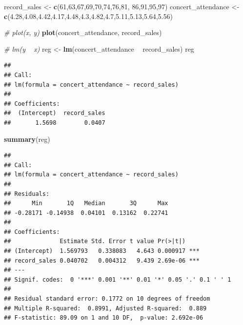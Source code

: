 \documentclass[]{book}
\newenvironment{Shaded}{\begin{snugshade}}{\end{snugshade}}
\newcommand{\CommentTok}[1]{\textcolor[rgb]{0.56,0.35,0.01}{\textit{#1}}}
\newcommand{\DecValTok}[1]{\textcolor[rgb]{0.00,0.00,0.81}{#1}}
\newcommand{\FloatTok}[1]{\textcolor[rgb]{0.00,0.00,0.81}{#1}}
\newcommand{\KeywordTok}[1]{\textcolor[rgb]{0.13,0.29,0.53}{\textbf{#1}}}
\newcommand{\NormalTok}[1]{#1}
\newcommand{\OperatorTok}[1]{\textcolor[rgb]{0.81,0.36,0.00}{\textbf{#1}}}
\newcommand{\StringTok}[1]{\textcolor[rgb]{0.31,0.60,0.02}{#1}}
\begin{document}
\begin{Shaded}
\begin{Highlighting}[]
\NormalTok{record_sales <-}\StringTok{ }\KeywordTok{c}\NormalTok{(}\DecValTok{61}\NormalTok{,}\DecValTok{63}\NormalTok{,}\DecValTok{67}\NormalTok{,}\DecValTok{69}\NormalTok{,}\DecValTok{70}\NormalTok{,}\DecValTok{74}\NormalTok{,}\DecValTok{76}\NormalTok{,}\DecValTok{81}\NormalTok{, }\DecValTok{86}\NormalTok{,}\DecValTok{91}\NormalTok{,}\DecValTok{95}\NormalTok{,}\DecValTok{97}\NormalTok{)}
\NormalTok{concert_attendance <-}\StringTok{ }\KeywordTok{c}\NormalTok{(}\FloatTok{4.28}\NormalTok{,}\FloatTok{4.08}\NormalTok{,}\FloatTok{4.42}\NormalTok{,}\FloatTok{4.17}\NormalTok{,}\FloatTok{4.48}\NormalTok{,}\FloatTok{4.3}\NormalTok{,}\FloatTok{4.82}\NormalTok{,}\FloatTok{4.7}\NormalTok{,}\FloatTok{5.11}\NormalTok{,}\FloatTok{5.13}\NormalTok{,}\FloatTok{5.64}\NormalTok{,}\FloatTok{5.56}\NormalTok{)}

\CommentTok{# plot(x, y)}
\KeywordTok{plot}\NormalTok{(concert_attendance, record_sales)}

\CommentTok{# lm(y ~ x)}
\NormalTok{reg <-}\StringTok{ }\KeywordTok{lm}\NormalTok{(concert_attendance }\OperatorTok{~}\StringTok{ }\NormalTok{record_sales)}
\NormalTok{reg}
\end{Highlighting}
\end{Shaded}

\begin{verbatim}
## 
## Call:
## lm(formula = concert_attendance ~ record_sales)
## 
## Coefficients:
##  (Intercept)  record_sales  
##       1.5698        0.0407
\end{verbatim}

\begin{Shaded}
\begin{Highlighting}[]
\KeywordTok{summary}\NormalTok{(reg)}
\end{Highlighting}
\end{Shaded}

\begin{verbatim}
## 
## Call:
## lm(formula = concert_attendance ~ record_sales)
## 
## Residuals:
##      Min       1Q   Median       3Q      Max 
## -0.28171 -0.14938  0.04101  0.13162  0.22741 
## 
## Coefficients:
##              Estimate Std. Error t value Pr(>|t|)    
## (Intercept)  1.569793   0.338083   4.643 0.000917 ***
## record_sales 0.040702   0.004312   9.439 2.69e-06 ***
## ---
## Signif. codes:  0 '***' 0.001 '**' 0.01 '*' 0.05 '.' 0.1 ' ' 1
## 
## Residual standard error: 0.1772 on 10 degrees of freedom
## Multiple R-squared:  0.8991, Adjusted R-squared:  0.889 
## F-statistic: 89.09 on 1 and 10 DF,  p-value: 2.692e-06
\end{verbatim}
\end{document}
